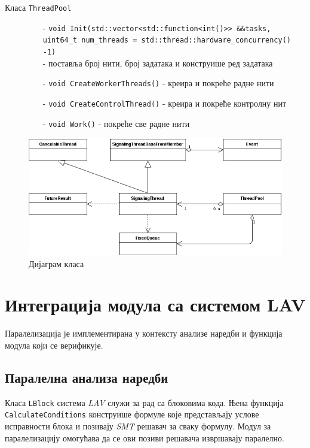 \documentclass[12pt,oneside]{memoir}
\begin{document}
\begin{description}
\begin{itemize}
		\end{itemize}			
	\item[Класа \texttt{ThreadPool}]\leavevmode
		\begin{itemize}
			\item[-] \texttt{void Init(std::vector<std::function<int()>> \&\&tasks, 
			\\
			uint64\_t num\_threads = std::thread::hardware\_concurrency() -1)}
			\\
			 - поставља број нити, број задатака и конструише ред задатака	
			\item[-]\texttt{void CreateWorkerThreads()} - креира и покреће радне нити 			 		\item[-] \texttt{void CreateControlThread()} - креира и покреће контролну нит
			\item[-] \texttt{void Work()} - покреће све радне нити
		\end{itemize}			
\end{description}

\begin{figure}[!ht]
  \centering
  \includegraphics[width=1.0\textwidth]{img/class_diag.png}
  \caption{Дијаграм класа}
  \label{fig:klasa_dij}
\end{figure}

\section{Интеграција модула са системом LAV}

Паралелизација је имплементирана у контексту анализе наредби и функција модула који се верификује. 

\subsection{Паралелна анализа наредби}

Класа \texttt{LBlock} система \textit{LAV} служи за рад са блоковима кода. Њена функција \texttt{CalculateConditions} конструише формуле које представљају услове исправности блока и позивају \textit{SMT} решавач за сваку формулу. Модул за паралелизацију омогућава да се ови позиви решавача извршавају паралелно.
\end{document}
